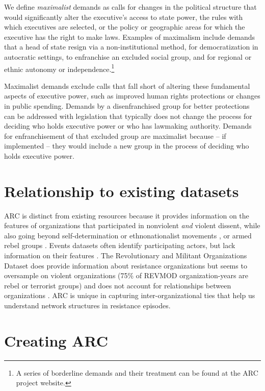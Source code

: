 We define \emph{maximalist} demands as calls for changes in the political
structure that would significantly alter the executive's access to state power,
the rules with which executives are selected, or the policy or geographic areas
for which the executive has the right to make laws. Examples of maximalism
include demands that a head of state resign via a non-institutional method, for
democratization in autocratic settings, to enfranchise an excluded social group,
and for regional or ethnic autonomy or independence.\footnote{A series of
borderline demands and their treatment can be found at the ARC project website.}

Maximalist demands exclude calls that fall short of altering these fundamental
aspects of executive power, such as improved human rights protections or changes
in public spending. Demands by a disenfranchised group for better protections
can be addressed with legislation that typically does not change the process for
deciding who holds executive power or who has lawmaking authority. Demands for
enfranchisement of that excluded group are maximalist because -- if implemented
-- they would include a new group in the process of deciding who holds executive
power. 


\section{Relationship to existing datasets}

ARC is distinct from existing resources because it provides information on the
features of organizations that participated in nonviolent \textit{and} violent
dissent, while also going beyond self-determination or ethnonationalist
movements \citep{Wilkenfeld2011, Cunningham2020}, or armed rebel groups
\citep{Pettersson2020a, Harbom2008, Braithwaite2020, Stewart2018,
Cunningham2013, Svensson2018, Cunningham2009a}. Events datasets often identify
participating actors, but lack information on their features
\citep{Chenoweth2018, Chenoweth2019b, Salehyan2012, Clark2021, Raleigh2010,
Chenoweth2019b}. The Revolutionary and Militant Organizations Dataset does
provide information about resistance organizations but seems to oversample on
violent organizations (75\% of REVMOD organization-years are rebel or terrorist
groups) and does not account for relationships between organizations
\citep{Acosta2019}. ARC is unique in capturing inter-organizational ties that
help us understand network structures in resistance episodes. 


\section{Creating ARC}

